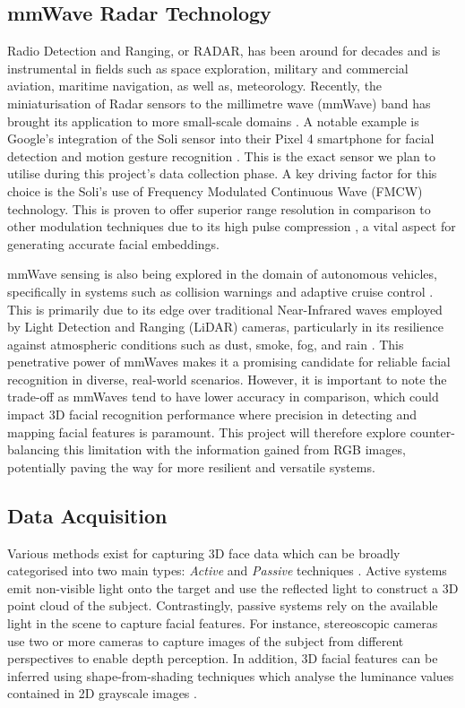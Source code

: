 \documentclass{interim}
\begin{document}
\subsection{mmWave Radar Technology}
Radio Detection and Ranging, or RADAR, has been around for decades and is instrumental in fields such as space exploration, military and commercial aviation, maritime navigation, as well as, meteorology. Recently, the miniaturisation of Radar sensors to the millimetre wave (mmWave) band has brought its application to more small-scale domains \cite{soumya2023recent}. A notable example is Google's integration of the Soli sensor into their Pixel 4 smartphone for facial detection and motion gesture recognition \cite{googleblog2020}. This is the exact sensor we plan to utilise during this project's data collection phase. A key driving factor for this choice is the Soli's use of Frequency Modulated Continuous Wave (FMCW) technology. This is proven to offer superior range resolution in comparison to other modulation techniques due to its high pulse compression \cite{mahafza2005radar}, a vital aspect for generating accurate facial embeddings. 

mmWave sensing is also being explored in the domain of autonomous vehicles, specifically in systems such as collision warnings and adaptive cruise control \cite{dfrobot}. This is primarily due to its edge over traditional Near-Infrared waves employed by Light Detection and Ranging (LiDAR) cameras, particularly in its resilience against atmospheric conditions such as dust, smoke, fog, and rain \cite{cadenceblog2022}. This penetrative power of mmWaves makes it a promising candidate for reliable facial recognition in diverse, real-world scenarios. However, it is important to note the trade-off as mmWaves tend to have lower accuracy in comparison, which could impact 3D facial recognition performance where precision in detecting and mapping facial features is paramount. This project will therefore explore counter-balancing this limitation with the information gained from RGB images, potentially paving the way for more resilient and versatile systems.


\subsection{Data Acquisition}
\label{background:data_acquisition}
Various methods exist for capturing 3D face data which can be broadly categorised into two main types: \textit{Active} and \textit{Passive} techniques \cite{zhou20183d}. Active systems emit non-visible light onto the target and use the reflected light to construct a 3D point cloud of the subject. Contrastingly, passive systems rely on the available light in the scene to capture facial features. For instance, stereoscopic cameras use two or more cameras to capture images of the subject from different perspectives to enable depth perception. In addition, 3D facial features can be inferred using shape-from-shading techniques which analyse the luminance values contained in 2D grayscale images \cite{horn1977understanding}.
\end{document}
